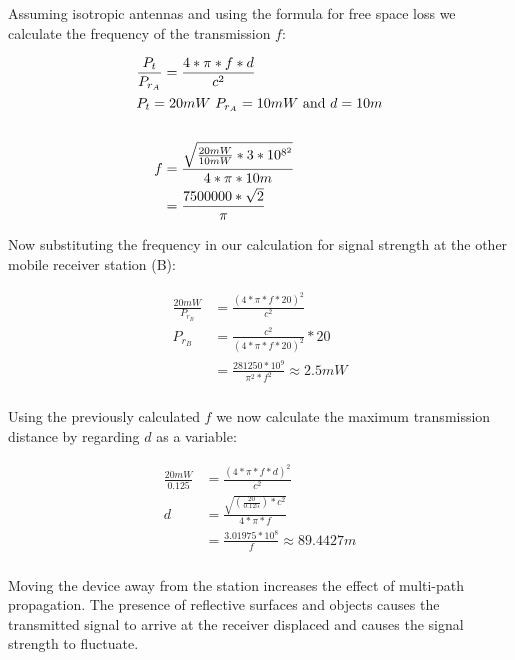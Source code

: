 \documentclass[12pt]{article}
\newcommand{\multipartexercise}{\addtocounter{subsection}{1}\setcounter{subsubsection}{0}}
\newcommand{\exercisepart}{\subsubsection{}}
\begin{document}
\multipartexercise \exercisepart
Assuming isotropic antennas and using the formula for free space loss we calculate the frequency of the transmission $f$:

\begin{align*}
    \frac{P_t}{P_{r_A}} &= \frac{4*\pi*f*d}{c^2} \\
    \intertext{$P_t=20mW$ $P_{r_A}=10mW$ and $d=10m$} \\
    f &= \frac{\sqrt{\frac{20mW}{10mW}*3*10^{8^2}}}{4*\pi*10m} \\
    &= \frac{7500000*\sqrt{2}}{\pi}
\end{align*}

Now substituting the frequency in our calculation for signal strength at the other mobile receiver station (B):

\begin{align*}
    \frac{20mW}{P_{r_B}} &= \frac{(4*\pi*f*20)^2}{c^2} \\
    P_{r_B} &= \frac{c^2}{(4*\pi*f*20)^2}*20 \\
    &= \frac{281250*10^9}{\pi^2*f^2} \approx 2.5mW
\end{align*}

\exercisepart
Using the previously calculated $f$ we now calculate the maximum transmission distance by regarding $d$ as a variable:

\begin{align*}
    \frac{20mW}{0.125} &= \frac{(4*\pi*f*d)^2}{c^2} \\
    d &= \frac{\sqrt{(\frac{20}{0.125})*c^2}}{4*\pi*f} \\
    &= \frac{3.01975*10^8}{f} \approx 89.4427m
\end{align*}

\exercisepart
Moving the device away from the station increases the effect of multi-path propagation. The presence of reflective surfaces and objects causes the transmitted signal to arrive at the receiver displaced and causes the signal strength to fluctuate.
\end{document}

